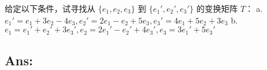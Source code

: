 \begin{example}[基变换矩阵求解]
    给定以下条件，试寻找从 \(\{e_1, e_2, e_3\}\) 到 \(\{e_1', e_2', e_3'\}\) 的变换矩阵 \(T\)：  
    a. \(e_1' = e_1 + 3e_2 - 4e_3, e_2' = 2e_1 - e_2 + 5e_3, e_3' = 4e_1 + 5e_2 + 3e_3\)  
    b. \(e_1 = e_1' + e_2' + 3e_3', e_2 = 2e_1' - e_2' + 4e_3', e_3 = 3e_1' + 5e_3'\)
    \end{example}
    
    \subsection*{Ans:}
    